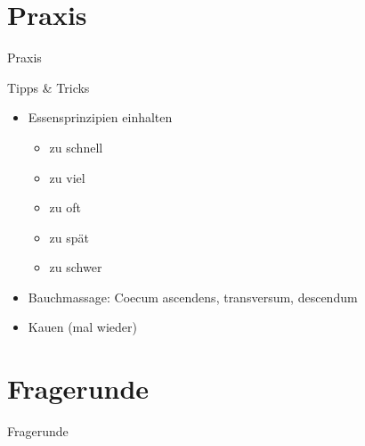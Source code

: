 \documentclass[xcolor=dvipsnames]{beamer}
\begin{document}
    \section{Praxis}
    {
        \begin{frame}
            \begin{center}
                \Huge Praxis
            \end{center}
        \end{frame}
    }

    \begin{frame}{Tipps \& Tricks}
        \begin{itemize}
            \setlength\itemsep{1em}
            \item Essensprinzipien einhalten
            \begin{itemize}
                \item zu schnell
                \item zu viel
                \item zu oft
                \item zu spät
                \item zu schwer
            \end{itemize}
            \item Bauchmassage: Coecum ascendens, transversum, descendum
            \item Kauen (mal wieder)
        \end{itemize}
    \end{frame}

    \section{Fragerunde}
    {
        \begin{frame}
            \begin{center}
                \Huge Fragerunde
            \end{center}
        \end{frame}
    }
\end{document}
